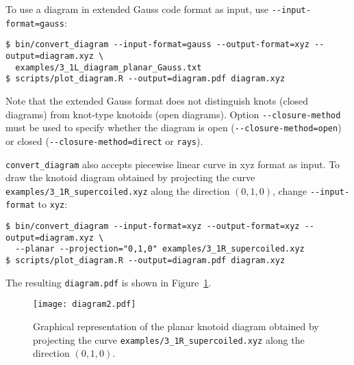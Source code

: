 To use a diagram in extended Gauss code format as input, use \lstinline{--input-format=gauss}:
\begin{lstlisting}
$ bin/convert_diagram --input-format=gauss --output-format=xyz --output=diagram.xyz \
  examples/3_1L_diagram_planar_Gauss.txt
$ scripts/plot_diagram.R --output=diagram.pdf diagram.xyz
\end{lstlisting}
Note that the extended Gauss format does not distinguish knots (closed diagrams) from knot-type knotoids (open diagrams). Option \lstinline{--closure-method} must be used to specify whether the diagram is open (\lstinline{--closure-method=open}) or closed (\lstinline{--closure-method=direct} or \lstinline{rays}).


\lstinline{convert_diagram} also accepts piecewise linear curve in xyz format as input.  To draw the knotoid diagram obtained by projecting the curve \lstinline{examples/3_1R_supercoiled.xyz} along the direction $(0,1,0)$, change \lstinline{--input-format} to \lstinline{xyz}:
\begin{lstlisting}
$ bin/convert_diagram --input-format=xyz --output-format=xyz --output=diagram.xyz \
  --planar --projection="0,1,0" examples/3_1R_supercoiled.xyz
$ scripts/plot_diagram.R --output=diagram.pdf diagram.xyz
\end{lstlisting}
The resulting \lstinline{diagram.pdf} is shown in Figure~\ref{fig:diagram2}.
\begin{figure}[t]
\centering
\texttt{[image: diagram2.pdf]}
\caption{Graphical representation of the planar knotoid diagram obtained by projecting the curve \lstinline{examples/3_1R_supercoiled.xyz} along the direction $(0,1,0)$.}\label{fig:diagram2}
\end{figure}

